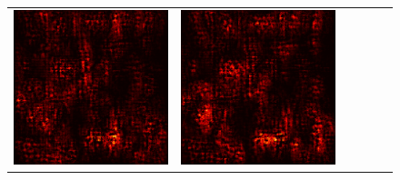 \documentclass[preprint,12pt]{elsarticle}
\begin{document}
\begin{figure}[p]
\begin{tabular}{cccccc}
  \includegraphics[scale=\scale]{../visualizations/examples/imagenette/cnn/positive_saliency_map/4.png} & 
  \includegraphics[scale=\scale]{../visualizations/examples/imagenette/cnn/negative_saliency_map/4.png} & 

\end{tabular}
\end{figure}
\end{document}
